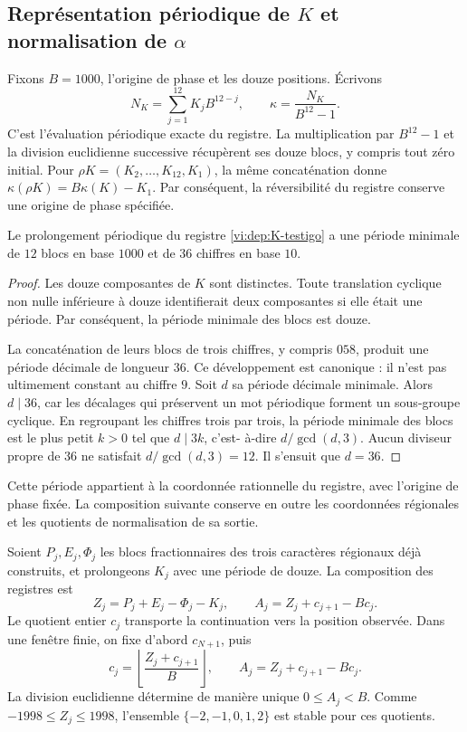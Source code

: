 \subsection{\texorpdfstring{Représentation périodique de \(K\) et normalisation de \(\alpha\)}{Représentation périodique de K et normalisation d’alpha}}
\label{vi:dep:alpha}

Fixons \(B=1000\), l’origine de phase et les douze positions. Écrivons
\[
 N_K=\sum_{j=1}^{12}K_jB^{12-j},\qquad
 \kappa=\frac{N_K}{B^{12}-1}.
\]
C’est l’évaluation périodique exacte du registre. La multiplication
par \(B^{12}-1\) et la division euclidienne successive récupèrent ses douze
blocs, y compris tout zéro initial. Pour
\(\rho K=(K_2,\ldots,K_{12},K_1)\), la même concaténation donne
\(\kappa(\rho K)=B\kappa(K)-K_1\). Par conséquent, la réversibilité
du registre conserve une origine de phase spécifiée.

\begin{proposition}
\label{vi:dep:periodo-minimo-k}
Le prolongement périodique du registre \eqref{vi:dep:K-testigo}
a une période minimale de \(12\) blocs en base \(1000\) et de
\(36\) chiffres en base \(10\).
\end{proposition}
\begin{proof}
Les douze composantes de \(K\) sont distinctes. Toute translation
cyclique non nulle inférieure à douze identifierait deux composantes si elle était
une période. Par conséquent, la période minimale des blocs est douze.

La concaténation de leurs blocs de trois chiffres, y compris \(058\),
produit une période décimale de longueur \(36\). Ce développement est
canonique : il n’est pas ultimement constant au chiffre \(9\).
Soit \(d\) sa période décimale minimale. Alors \(d\mid36\),
car les décalages qui préservent un mot périodique forment
un sous-groupe cyclique. En regroupant les chiffres trois par trois, la période
minimale des blocs est le plus petit \(k>0\) tel que \(d\mid3k\), c’est-
à-dire \(d/\gcd(d,3)\). Aucun diviseur propre de \(36\)
ne satisfait \(d/\gcd(d,3)=12\). Il s’ensuit que \(d=36\).
\end{proof}

Cette période appartient à la coordonnée rationnelle du registre, avec
l’origine de phase fixée. La composition suivante conserve en outre les
coordonnées régionales et les quotients de normalisation de sa sortie.

Soient \(P_j,E_j,\Phi_j\) les blocs fractionnaires des trois
caractères régionaux déjà construits, et prolongeons \(K_j\) avec une période de
douze. La composition des registres est
\begin{equation}
 Z_j=P_j+E_j-\Phi_j-K_j,
 \qquad
 A_j=Z_j+c_{j+1}-Bc_j.
 \label{vi:dep:normalizacion-alpha}
\end{equation}
Le quotient entier \(c_j\) transporte la continuation vers la position
observée. Dans une fenêtre finie, on fixe d’abord \(c_{N+1}\), puis
\[
 c_j=\left\lfloor\frac{Z_j+c_{j+1}}B\right\rfloor,
 \qquad A_j=Z_j+c_{j+1}-Bc_j.
\]
La division euclidienne détermine de manière unique \(0\le A_j<B\).
Comme \(-1998\le Z_j\le1998\), l’ensemble
\(\{-2,-1,0,1,2\}\) est stable pour ces quotients.

